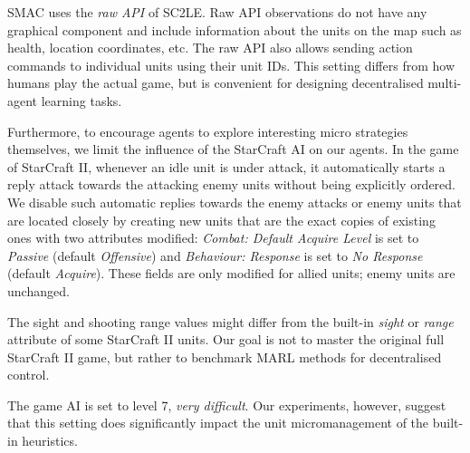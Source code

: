 SMAC uses the \textit{raw API} of SC2LE. Raw API observations do not have any graphical component and include information about the units on the map such as health, location coordinates, etc. The raw API also allows sending action commands to individual units using their unit IDs. This setting differs from how humans play the actual game, but is convenient for designing decentralised multi-agent learning tasks. 


Furthermore, to encourage agents to explore interesting micro strategies themselves, we limit the influence of the StarCraft AI on our agents. 
In the game of StarCraft II, whenever an idle unit is under attack, it automatically starts a reply attack towards the attacking enemy units without being explicitly ordered. We disable such automatic replies towards the enemy attacks or enemy units that are located closely by creating new units that are the exact copies of existing ones with two attributes modified: \textit{Combat: Default Acquire Level} is set to \textit{Passive} (default \textit{Offensive}) and \textit{Behaviour: Response} is set to \textit{No Response} (default \textit{Acquire}). These fields are only modified for allied units; enemy units are unchanged.

The sight and shooting range values might differ from the built-in \textit{sight} or \textit{range} attribute of some StarCraft II units. Our goal is not to master the original full StarCraft II game, but rather to benchmark MARL methods for decentralised control.

The game AI is set to level 7, \textit{very difficult}. Our experiments, however, suggest that this setting does significantly impact the unit micromanagement of the built-in heuristics.